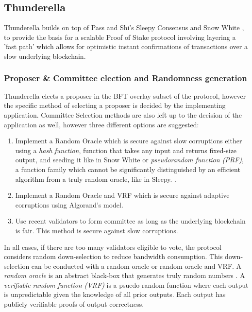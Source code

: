 \documentclass[10pt,journal,compsoc]{IEEEtran}
\begin{document}
\subsection{Thunderella}
Thunderella \cite{Thunderella} builds on top of Pass and Shi's Sleepy Consensus \cite{Sleepy} and Snow White \cite{SnowWhite}, to provide the basis for a scalable
 Proof of Stake protocol involving layering a 'fast path' which allows for optimistic instant confirmations of transactions over a slow underlying blockchain. 

\subsubsection{Proposer \& Committee election and Randomness generation}

Thunderella elects a proposer in the BFT overlay subset of the protocol, however the specific method of selecting a proposer is decided by the implementing application. Committee Selection methods are also left up to the decision of the application as well, however three different options are suggested:
\begin{enumerate} \item Implement a Random Oracle which is secure against slow corruptions either using a \emph{hash function}, function that takes any input and returns fixed-size output, \indent and seeding it like in Snow White
\cite{SnowWhite} or  \emph{pseudorandom function (PRF)}, a function family which cannot be significantly distinguished by an efficient algorithm from a truly random oracle, like in Sleepy. \cite{Sleepy}.
\item Implement a Random Oracle and VRF which is secure \indent against adaptive corruptions using Algorand's model.
\item Use recent validators to form committee as long as the underlying blockchain is fair. This method is secure against slow corruptions.
\end{enumerate}

In all cases, if there are too many validators eligible to vote, the protocol considers random down-selection to reduce bandwidth consumption. This down-selection can be conducted with a random oracle or random oracle and VRF.
A \emph{random oracle} is an abstract black-box that generates truly random numbers \cite{Mahnush}. A \emph{verifiable random function (VRF)} is a psuedo-random function where each output is unpredictable given the knowledge of all prior outputs. Each output has publicly verifiable proofs of output correctness. \cite{MicaliEtAl} 
\end{document}
